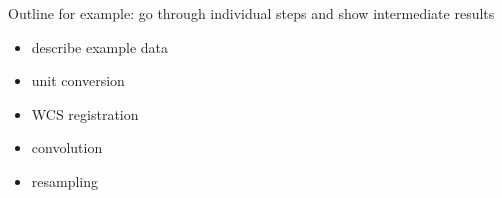 Outline for example: go through individual steps and show intermediate results

\begin{itemize}
\item describe example data
\item unit conversion
\item WCS registration
\item convolution
\item resampling
\end{itemize}

